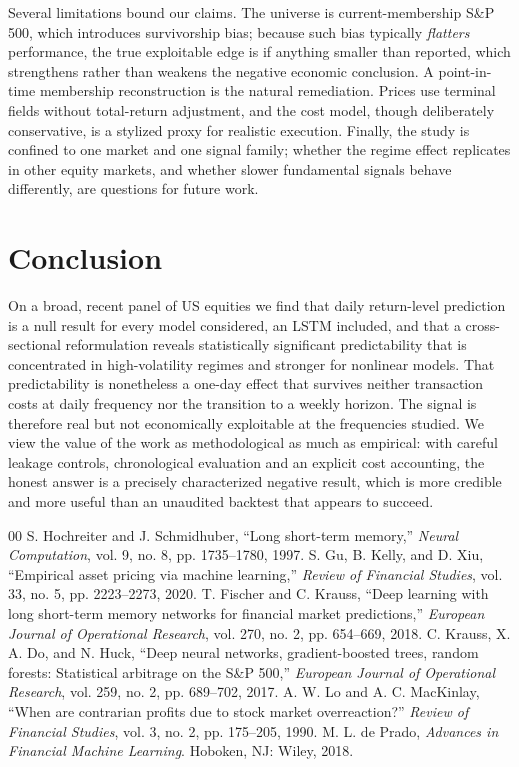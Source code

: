 \documentclass[conference]{IEEEtran}
\begin{document}
Several limitations bound our claims. The universe is current-membership S\&P 500,
which introduces survivorship bias; because such bias typically \emph{flatters}
performance, the true exploitable edge is if anything smaller than reported, which
strengthens rather than weakens the negative economic conclusion. A point-in-time
membership reconstruction is the natural remediation. Prices use terminal fields
without total-return adjustment, and the cost model, though deliberately
conservative, is a stylized proxy for realistic execution. Finally, the study is
confined to one market and one signal family; whether the regime effect replicates
in other equity markets, and whether slower fundamental signals behave differently,
are questions for future work.

\section{Conclusion}
On a broad, recent panel of US equities we find that daily return-level prediction
is a null result for every model considered, an LSTM included, and that a
cross-sectional reformulation reveals statistically significant predictability that
is concentrated in high-volatility regimes and stronger for nonlinear models. That
predictability is nonetheless a one-day effect that survives neither transaction
costs at daily frequency nor the transition to a weekly horizon. The signal is
therefore real but not economically exploitable at the frequencies studied. We view
the value of the work as methodological as much as empirical: with careful
leakage controls, chronological evaluation and an explicit cost accounting, the
honest answer is a precisely characterized negative result, which is more credible
and more useful than an unaudited backtest that appears to succeed.

\begin{thebibliography}{00}
 S. Hochreiter and J. Schmidhuber, ``Long short-term
memory,'' \emph{Neural Computation}, vol. 9, no. 8, pp. 1735--1780, 1997.
 S. Gu, B. Kelly, and D. Xiu, ``Empirical asset pricing via machine
learning,'' \emph{Review of Financial Studies}, vol. 33, no. 5, pp. 2223--2273,
2020.
 T. Fischer and C. Krauss, ``Deep learning with long
short-term memory networks for financial market predictions,'' \emph{European
Journal of Operational Research}, vol. 270, no. 2, pp. 654--669, 2018.
 C. Krauss, X. A. Do, and N. Huck, ``Deep neural networks,
gradient-boosted trees, random forests: Statistical arbitrage on the S\&P 500,''
\emph{European Journal of Operational Research}, vol. 259, no. 2, pp. 689--702,
2017.
 A. W. Lo and A. C. MacKinlay, ``When are contrarian profits due to
stock market overreaction?'' \emph{Review of Financial Studies}, vol. 3, no. 2,
pp. 175--205, 1990.
 M. L. de Prado, \emph{Advances in Financial Machine
Learning}. Hoboken, NJ: Wiley, 2018.
\end{thebibliography}
\end{document}
